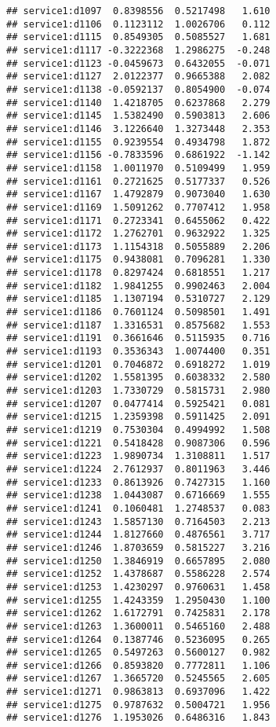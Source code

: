\documentclass[
]{article}
\begin{document}
\begin{verbatim}
## service1:d1097  0.8398556  0.5217498   1.610
## service1:d1106  0.1123112  1.0026706   0.112
## service1:d1115  0.8549305  0.5085527   1.681
## service1:d1117 -0.3222368  1.2986275  -0.248
## service1:d1123 -0.0459673  0.6432055  -0.071
## service1:d1127  2.0122377  0.9665388   2.082
## service1:d1138 -0.0592137  0.8054900  -0.074
## service1:d1140  1.4218705  0.6237868   2.279
## service1:d1145  1.5382490  0.5903813   2.606
## service1:d1146  3.1226640  1.3273448   2.353
## service1:d1155  0.9239554  0.4934798   1.872
## service1:d1156 -0.7833596  0.6861922  -1.142
## service1:d1158  1.0011970  0.5109499   1.959
## service1:d1161  0.2721625  0.5177337   0.526
## service1:d1167  1.4792879  0.9073040   1.630
## service1:d1169  1.5091262  0.7707412   1.958
## service1:d1171  0.2723341  0.6455062   0.422
## service1:d1172  1.2762701  0.9632922   1.325
## service1:d1173  1.1154318  0.5055889   2.206
## service1:d1175  0.9438081  0.7096281   1.330
## service1:d1178  0.8297424  0.6818551   1.217
## service1:d1182  1.9841255  0.9902463   2.004
## service1:d1185  1.1307194  0.5310727   2.129
## service1:d1186  0.7601124  0.5098501   1.491
## service1:d1187  1.3316531  0.8575682   1.553
## service1:d1191  0.3661646  0.5115935   0.716
## service1:d1193  0.3536343  1.0074400   0.351
## service1:d1201  0.7046872  0.6918272   1.019
## service1:d1202  1.5581395  0.6038332   2.580
## service1:d1203  1.7330729  0.5815731   2.980
## service1:d1207  0.0477414  0.5925421   0.081
## service1:d1215  1.2359398  0.5911425   2.091
## service1:d1219  0.7530304  0.4994992   1.508
## service1:d1221  0.5418428  0.9087306   0.596
## service1:d1223  1.9890734  1.3108811   1.517
## service1:d1224  2.7612937  0.8011963   3.446
## service1:d1233  0.8613926  0.7427315   1.160
## service1:d1238  1.0443087  0.6716669   1.555
## service1:d1241  0.1060481  1.2748537   0.083
## service1:d1243  1.5857130  0.7164503   2.213
## service1:d1244  1.8127660  0.4876561   3.717
## service1:d1246  1.8703659  0.5815227   3.216
## service1:d1250  1.3846919  0.6657895   2.080
## service1:d1252  1.4378687  0.5586228   2.574
## service1:d1253  1.4230297  0.9760631   1.458
## service1:d1255  1.4243359  1.2950430   1.100
## service1:d1262  1.6172791  0.7425831   2.178
## service1:d1263  1.3600011  0.5465160   2.488
## service1:d1264  0.1387746  0.5236095   0.265
## service1:d1265  0.5497263  0.5600127   0.982
## service1:d1266  0.8593820  0.7772811   1.106
## service1:d1267  1.3665720  0.5245565   2.605
## service1:d1271  0.9863813  0.6937096   1.422
## service1:d1275  0.9787632  0.5004721   1.956
## service1:d1276  1.1953026  0.6486316   1.843

\end{verbatim}
\end{document}
